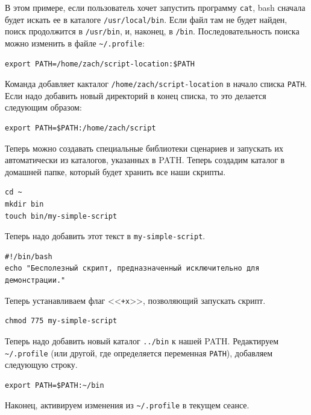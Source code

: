 \documentclass[12pt]{article}
\begin{document}
В этом примере, если пользователь хочет запустить программу
\texttt{cat}, bash сначала будет искать ее в каталоге
\texttt{/usr/local/bin}. Если файл там не будет найден, поиск продолжится в
\texttt{/usr/bin}, и, наконец, в \texttt{/bin}. Последовательность поиска можно изменить
в файле \texttt{\textasciitilde{}/.profile}:

\begin{verbatim}
export PATH=/home/zach/script-location:$PATH
\end{verbatim}

Команда добавляет какталог \texttt{/home/zach/script-location} в
начало списка \texttt{PATH}. Если надо добавить новый директорий
в конец списка, то это делается следующим образом:

\begin{verbatim}
export PATH=$PATH:/home/zach/script
\end{verbatim}

Теперь можно создавать специальные библиотеки сценариев и запускать их
автоматически из каталогов, указанных в PATH. Теперь создадим каталог
в домашней папке, который будет хранить все наши скрипты.

\begin{verbatim}
cd ~
mkdir bin
touch bin/my-simple-script
\end{verbatim}

Теперь надо добавить этот текст в \texttt{my-simple-script}.

\begin{verbatim}
#!/bin/bash
echo "Бесполезный скрипт, предназначенный исключительно для демонстрации."
\end{verbatim}

Теперь устанавливаем флаг <<\texttt{+x}>>, позволяющий запускать скрипт.

\begin{verbatim}
chmod 775 my-simple-script
\end{verbatim}

Теперь надо добавить новый каталог \texttt{../bin} к нашей PATH.
Редактируем \texttt{\textasciitilde{}/.profile} (или другой, где
определяется переменная \texttt{PATH}), добавляем следующую строку.

\begin{verbatim}
export PATH=$PATH:~/bin
\end{verbatim}

Наконец, активируем изменения из
\texttt{\textasciitilde{}/.profile} в текущем сеансе.
\end{document}
